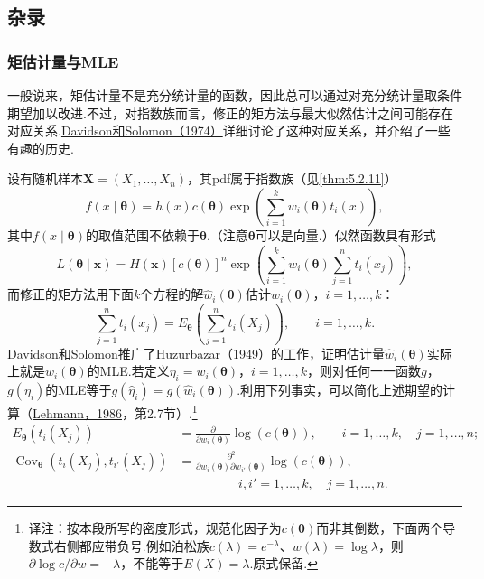 \subsection{杂录}\label{sec:7.5}
\subsubsection{矩估计量与MLE}\label{sec:7.5.1}
一般说来，矩估计量不是充分统计量的函数，因此总可以通过对充分统计量取条件期望加以改进.不过，对指数族而言，修正的矩方法与最大似然估计之间可能存在对应关系.\hyperref[bib:source93]{Davidson和Solomon（1974）}详细讨论了这种对应关系，并介绍了一些有趣的历史.

设有随机样本$\boldsymbol X=(X_1,\ldots,X_n)$，其pdf属于指数族（见\autoref{thm:5.2.11}）
$$f(x\mid\boldsymbol\theta)=h(x)c(\boldsymbol\theta)\exp\left(\sum_{i=1}^kw_i(\boldsymbol\theta)t_i(x)\right),$$
其中$f(x\mid\boldsymbol\theta)$的取值范围不依赖于$\boldsymbol\theta$.（注意$\boldsymbol\theta$可以是向量.）似然函数具有形式
$$L(\boldsymbol\theta\mid\boldsymbol x)=H(\boldsymbol x)[c(\boldsymbol\theta)]^n\exp\left(\sum_{i=1}^kw_i(\boldsymbol\theta)\sum_{j=1}^nt_i(x_j)\right),$$
而修正的矩方法用下面$k$个方程的解$\widehat w_i(\boldsymbol\theta)$估计$w_i(\boldsymbol\theta)$，$i=1,\ldots,k$：
$$\sum_{j=1}^nt_i(x_j)=E_{\boldsymbol\theta}\left(\sum_{j=1}^nt_i(X_j)\right),\qquad i=1,\ldots,k.$$
Davidson和Solomon推广了\hyperref[bib:source173]{Huzurbazar（1949）}的工作，证明估计量$\widehat w_i(\boldsymbol\theta)$实际上就是$w_i(\boldsymbol\theta)$的MLE.若定义$\eta_i=w_i(\boldsymbol\theta)$，$i=1,\ldots,k$，则对任何一一函数$g$，$g(\eta_i)$的MLE等于$g(\widehat\eta_i)=g(\widehat w_i(\boldsymbol\theta))$.利用下列事实，可以简化上述期望的计算（\hyperref[bib:source198]{Lehmann，1986}，第2.7节）.\footnote{译注：按本段所写的密度形式，规范化因子为$c(\boldsymbol\theta)$而非其倒数，下面两个导数式右侧都应带负号.例如泊松族$c(\lambda)=e^{-\lambda}$、$w(\lambda)=\log\lambda$，则$\partial\log c/\partial w=-\lambda$，不能等于$E(X)=\lambda$.原式保留.}
\begin{align*}
E_{\boldsymbol\theta}(t_i(X_j))
&=\frac{\partial}{\partial w_i(\boldsymbol\theta)}\log(c(\boldsymbol\theta)),\qquad i=1,\ldots,k,\quad j=1,\ldots,n;\\
\operatorname{Cov}_{\boldsymbol\theta}(t_i(X_j),t_{i'}(X_j))
&=\frac{\partial^2}{\partial w_i(\boldsymbol\theta)\partial w_{i'}(\boldsymbol\theta)}\log(c(\boldsymbol\theta)),\\[-2pt]
&\hspace{2cm}i,i'=1,\ldots,k,\quad j=1,\ldots,n.
\end{align*}
